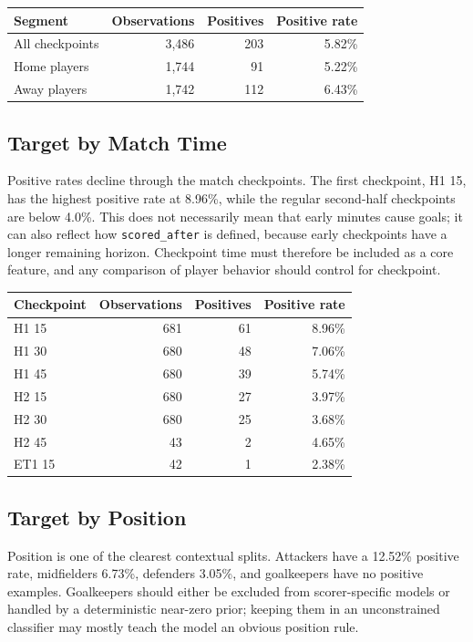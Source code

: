 \documentclass[11pt]{article}
\begin{document}
\begin{longtable}{lrrr}
\toprule
Segment & Observations & Positives & Positive rate \\
\midrule
All checkpoints & 3,486 & 203 & 5.82\% \\
Home players & 1,744 & 91 & 5.22\% \\
Away players & 1,742 & 112 & 6.43\% \\
\bottomrule
\end{longtable}

\subsection{Target by Match Time}
Positive rates decline through the match checkpoints.
The first checkpoint, H1 15, has the highest positive rate at 8.96\%, while the regular second-half checkpoints are below 4.0\%.
This does not necessarily mean that early minutes cause goals; it can also reflect how \texttt{scored\_after} is defined, because early checkpoints have a longer remaining horizon.
Checkpoint time must therefore be included as a core feature, and any comparison of player behavior should control for checkpoint.

\begin{longtable}{lrrr}
\toprule
Checkpoint & Observations & Positives & Positive rate \\
\midrule
H1 15 & 681 & 61 & 8.96\% \\
H1 30 & 680 & 48 & 7.06\% \\
H1 45 & 680 & 39 & 5.74\% \\
H2 15 & 680 & 27 & 3.97\% \\
H2 30 & 680 & 25 & 3.68\% \\
H2 45 & 43 & 2 & 4.65\% \\
ET1 15 & 42 & 1 & 2.38\% \\
\bottomrule
\end{longtable}

\subsection{Target by Position}
Position is one of the clearest contextual splits.
Attackers have a 12.52\% positive rate, midfielders 6.73\%, defenders 3.05\%, and goalkeepers have no positive examples.
Goalkeepers should either be excluded from scorer-specific models or handled by a deterministic near-zero prior; keeping them in an unconstrained classifier may mostly teach the model an obvious position rule.
\end{document}
